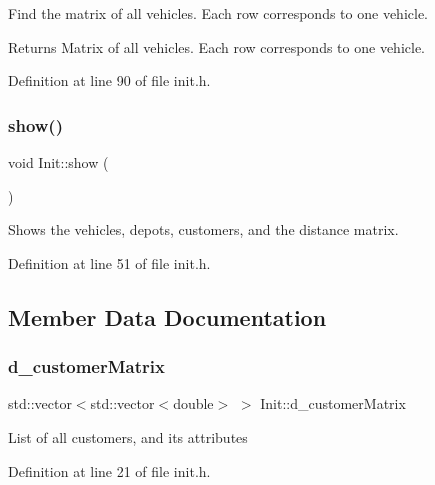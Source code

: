 Find the matrix of all vehicles. Each row corresponds to one vehicle. \begin{DoxyReturn}{Returns}
Matrix of all vehicles. Each row corresponds to one vehicle. 
\end{DoxyReturn}


Definition at line 90 of file init.\+h.

\mbox{\label{class_init_a9f8816aee25eb57e9a8f133244fbffda}} 
\subsubsection{\texorpdfstring{show()}{show()}}
{\footnotesize\ttfamily void Init\+::show (\begin{DoxyParamCaption}{ }\end{DoxyParamCaption})\hspace{0.3cm}{\ttfamily [inline]}}

Shows the vehicles, depots, customers, and the distance matrix. 

Definition at line 51 of file init.\+h.



\subsection{Member Data Documentation}
\mbox{\label{class_init_a17dd120f45612ac00015ab0650025afc}} 
\subsubsection{\texorpdfstring{d\+\_\+customer\+Matrix}{d\_customerMatrix}}
{\footnotesize\ttfamily std\+::vector$<$std\+::vector$<$double$>$ $>$ Init\+::d\+\_\+customer\+Matrix\hspace{0.3cm}{\ttfamily [private]}}

List of all customers, and its attributes 

Definition at line 21 of file init.\+h.

\mbox{\label{class_init_a3472bd129b55c09b49cfcccae49b7d6b}} 
